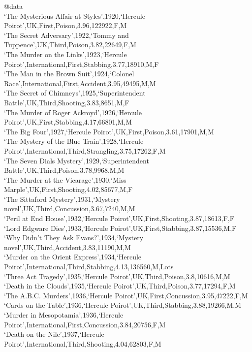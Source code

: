 \documentclass{mproj}
\begin{document}
@data\\
`The Mysterious Affair at Styles',1920,`Hercule Poirot',UK,First,Poison,3.96,122922,F,M\\
`The Secret Adversary',1922,`Tommy and Tuppence',UK,Third,Poison,3.82,22649,F,M\\
`The Murder on the Links',1923,`Hercule Poirot',International,First,Stabbing,3.77,18910,M,F\\
`The Man in the Brown Suit',1924,`Colonel Race',International,First,Accident,3.95,49495,M,M\\
`The Secret of Chimneys',1925,`Superintendent Battle',UK,Third,Shooting,3.83,8651,M,F\\
`The Murder of Roger Ackroyd',1926,`Hercule Poirot',UK,First,Stabbing,4.17,66801,M,M\\
`The Big Four',1927,`Hercule Poirot',UK,First,Poison,3.61,17901,M,M\\
`The Mystery of the Blue Train',1928,`Hercule Poirot',International,Third,Strangling,3.75,17262,F,M\\
`The Seven Dials Mystery',1929,`Superintendent Battle',UK,Third,Poison,3.78,9968,M,M\\
`The Murder at the Vicarage',1930,`Miss Marple',UK,First,Shooting,4.02,85677,M,F\\
`The Sittaford Mystery',1931,`Mystery novel',UK,Third,Concussion,3.67,7240,M,M\\
`Peril at End House',1932,`Hercule Poirot',UK,First,Shooting,3.87,18613,F,F\\
`Lord Edgware Dies',1933,`Hercule Poirot',UK,First,Stabbing,3.87,15536,M,F\\
`Why Didn't They Ask Evans?',1934,`Mystery novel',UK,Third,Accident,3.83,11190,M,M\\
`Murder on the Orient Express',1934,`Hercule Poirot',International,Third,Stabbing,4.13,136560,M,Lots\\
`Three Act Tragedy',1935,`Hercule Poirot',UK,Third,Poison,3.8,10616,M,M\\
`Death in the Clouds',1935,`Hercule Poirot',UK,Third,Poison,3.77,17294,F,M\\
`The A.B.C. Murders',1936,`Hercule Poirot',UK,First,Concussion,3.95,47222,F,M\\
`Cards on the Table',1936,`Hercule Poirot',UK,Third,Stabbing,3.88,19266,M,M\\
`Murder in Mesopotamia',1936,`Hercule Poirot',International,First,Concussion,3.84,20756,F,M\\
`Death on the Nile',1937,`Hercule Poirot',International,Third,Shooting,4.04,62803,F,M\\
\end{document}
